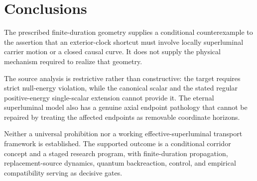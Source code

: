 \documentclass[11pt]{article}
\begin{document}
\section{Conclusions}
The prescribed finite-duration geometry supplies a conditional counterexample to the assertion that an exterior-clock shortcut must involve locally superluminal carrier motion or a closed causal curve. It does not supply the physical mechanism required to realize that geometry.

The source analysis is restrictive rather than constructive: the target requires strict null-energy violation, while the canonical scalar and the stated regular positive-energy single-scalar extension cannot provide it. The eternal superluminal model also has a genuine axial endpoint pathology that cannot be repaired by treating the affected endpoints as removable coordinate horizons.

Neither a universal prohibition nor a working effective-superluminal transport framework is established. The supported outcome is a conditional corridor concept and a staged research program, with finite-duration propagation, replacement-source dynamics, quantum backreaction, control, and empirical compatibility serving as decisive gates.

\appendix
\end{document}
